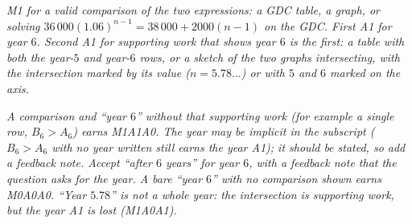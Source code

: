 \documentclass[12pt, twoside]{article}
\begin{document}
\begin{enumerate}[itemsep=0.3cm]
\emph{M1 for a valid comparison of the two expressions: a GDC table, a
graph, or solving $36\,000(1.06)^{n - 1} = 38\,000 + 2000(n - 1)$ on the
GDC. First A1 for year $6$. Second A1 for supporting work that shows year
$6$ is the first: a table with both the year-$5$ and year-$6$ rows, or a
sketch of the two graphs intersecting, with the intersection marked by its
value ($n = 5.78\ldots$) or with $5$ and $6$ marked on the axis.}

\emph{A comparison and ``year $6$'' without that supporting work (for
example a single row, $B_{6} > A_{6}$) earns M1A1A0. The year may be
implicit in the subscript ($B_{6} > A_{6}$ with no year written still earns
the year A1); it should be stated, so add a feedback note. Accept ``after
$6$ years'' for year $6$, with a feedback note that the question asks for
the year. A bare ``year $6$''
with no comparison shown earns M0A0A0. ``Year $5.78$'' is not a whole
year: the intersection is supporting work, but the year A1 is lost
(M1A0A1).}

\end{enumerate}
\end{document}
